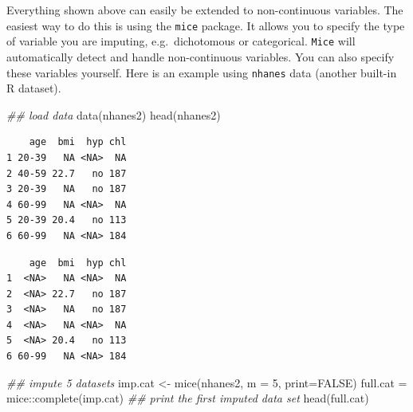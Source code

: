 \documentclass[
  letterpaper,
  DIV=11,
  numbers=noendperiod]{scrreprt}
\newenvironment{Shaded}{\begin{snugshade}}{\end{snugshade}}
\newcommand{\AttributeTok}[1]{\textcolor[rgb]{0.49,0.56,0.16}{#1}}
\newcommand{\ConstantTok}[1]{\textcolor[rgb]{0.53,0.00,0.00}{#1}}
\newcommand{\DecValTok}[1]{\textcolor[rgb]{0.25,0.63,0.44}{#1}}
\newcommand{\DocumentationTok}[1]{\textcolor[rgb]{0.73,0.13,0.13}{\textit{#1}}}
\newcommand{\FunctionTok}[1]{\textcolor[rgb]{0.02,0.16,0.49}{#1}}
\newcommand{\NormalTok}[1]{\textcolor[rgb]{0.00,0.44,0.13}{#1}}
\newcommand{\OtherTok}[1]{\textcolor[rgb]{0.00,0.44,0.13}{#1}}
\newcommand{\SpecialCharTok}[1]{\textcolor[rgb]{0.25,0.44,0.63}{#1}}
\begin{document}
Everything shown above can easily be extended to non-continuous
variables. The easiest way to do this is using the \texttt{mice}
package. It allows you to specify the type of variable you are imputing,
e.g.~dichotomous or categorical. \texttt{Mice} will automatically detect
and handle non-continuous variables. You can also specify these
variables yourself. Here is an example using \texttt{nhanes} data
(another built-in R dataset).

\begin{Shaded}
\begin{Highlighting}[]
\DocumentationTok{\#\# load data }
  \FunctionTok{data}\NormalTok{(nhanes2)}
  \FunctionTok{head}\NormalTok{(nhanes2)}
\end{Highlighting}
\end{Shaded}

\begin{verbatim}
    age  bmi  hyp chl
1 20-39   NA <NA>  NA
2 40-59 22.7   no 187
3 20-39   NA   no 187
4 60-99   NA <NA>  NA
5 20-39 20.4   no 113
6 60-99   NA <NA> 184
\end{verbatim}

\begin{Shaded}
\end{Shaded}

\begin{verbatim}
    age  bmi  hyp chl
1  <NA>   NA <NA>  NA
2  <NA> 22.7   no 187
3  <NA>   NA   no 187
4  <NA>   NA <NA>  NA
5  <NA> 20.4   no 113
6 60-99   NA <NA> 184
\end{verbatim}

\begin{Shaded}
\begin{Highlighting}[]
\DocumentationTok{\#\# impute 5 datasets }
\NormalTok{  imp.cat }\OtherTok{\textless{}{-}} \FunctionTok{mice}\NormalTok{(nhanes2, }\AttributeTok{m =} \DecValTok{5}\NormalTok{, }\AttributeTok{print=}\ConstantTok{FALSE}\NormalTok{)     }
\NormalTok{  full.cat }\OtherTok{=}\NormalTok{ mice}\SpecialCharTok{::}\FunctionTok{complete}\NormalTok{(imp.cat)           }\DocumentationTok{\#\# print the first imputed data set}
  \FunctionTok{head}\NormalTok{(full.cat)}
\end{Highlighting}
\end{Shaded}
\end{document}
